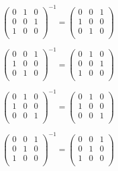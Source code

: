 \documentclass[oneside,12pt]{amsart}
\begin{document}
\smallskip

$
\begin{pmatrix}
0 & 1 & 0 \\
0 & 0 & 1 \\
1 & 0 & 0 \\
\end{pmatrix}^{-1}
=
\begin{pmatrix}
0 & 0 & 1 \\
1 & 0 & 0 \\
0 & 1 & 0 \\
\end{pmatrix}
$

\smallskip

$
\begin{pmatrix}
0 & 0 & 1 \\
1 & 0 & 0 \\
0 & 1 & 0 \\
\end{pmatrix}^{-1}
=
\begin{pmatrix}
0 & 1 & 0 \\
0 & 0 & 1 \\
1 & 0 & 0 \\
\end{pmatrix}
$

\smallskip

$
\begin{pmatrix}
0 & 1 & 0 \\
1 & 0 & 0 \\
0 & 0 & 1 \\
\end{pmatrix}^{-1}
=
\begin{pmatrix}
0 & 1 & 0 \\
1 & 0 & 0 \\
0 & 0 & 1 \\
\end{pmatrix}
$

\smallskip

$
\begin{pmatrix}
0 & 0 & 1 \\
0 & 1 & 0 \\
1 & 0 & 0 \\
\end{pmatrix}^{-1}
=
\begin{pmatrix}
0 & 0 & 1 \\
0 & 1 & 0 \\
1 & 0 & 0 \\
\end{pmatrix}
$

\smallskip
\end{document}
